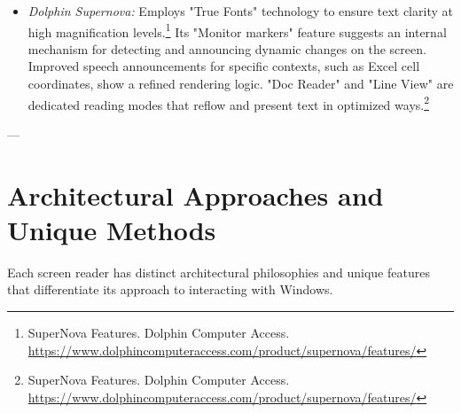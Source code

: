 \begin{itemize}
    \item \emph{Dolphin Supernova:} Employs "True Fonts" technology to ensure text clarity at high magnification levels.\footnote{SuperNova Features. Dolphin Computer Access. \url{https://www.dolphincomputeraccess.com/product/supernova/features/}} Its "Monitor markers" feature suggests an internal mechanism for detecting and announcing dynamic changes on the screen. Improved speech announcements for specific contexts, such as Excel cell coordinates, show a refined rendering logic. "Doc Reader" and "Line View" are dedicated reading modes that reflow and present text in optimized ways.\footnote{SuperNova Features. Dolphin Computer Access. \url{https://www.dolphincomputeraccess.com/product/supernova/features/}}
\end{itemize}

---

\section{Architectural Approaches and Unique Methods}
\label{sec:architectural-approaches}

Each screen reader has distinct architectural philosophies and unique features that differentiate its approach to interacting with Windows.

